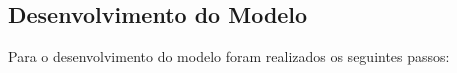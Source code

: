 
\subsection{Desenvolvimento do Modelo}
Para o desenvolvimento do modelo foram realizados os seguintes passos:

